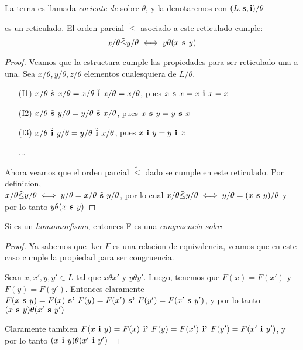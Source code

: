 \begin{definition}
  La terna  es llamada \emph{cociente de} \reticulAlg sobre $\theta$,
  y la denotaremos con $(L, \textbf{s}, \textbf{i})/\theta$
\end{definition}

\begin{lemma}
   es un reticulado. El orden
  parcial $\tilde{\leq}$ asociado a este reticulado cumple:
  $$
  x/\theta \tilde{\leq} y/\theta \iff y\theta(x\textbf{ s }y)
  $$
\end{lemma}

\begin{proof}
  Veamos que la estructura  cumple las propiedades para ser reticulado una a una.
  Sea $x/\theta, y/\theta, z/\theta$ elementos cualesquiera de $L/\theta$.
  \begin{itemize}
    \item[(I1)] $x/\theta\tilde{\textbf{ s }}x/\theta = x/\theta\tilde{\textbf{ i }}x/\theta = x/\theta$, pues $x\textbf{ s }x = x\textbf{ i }x = x$
    \item[(I2)] $x/\theta\tilde{\textbf{ s }}y/\theta = y/\theta\tilde{\textbf{ s }}x/\theta$, pues $x\textbf{ s }y = y\textbf{ s }x$
    \item[(I3)] $x/\theta\tilde{\textbf{ i }}y/\theta = y/\theta\tilde{\textbf{ i }}x/\theta$, pues $x\textbf{ i }y = y\textbf{ i }x$
    \item[] ... 
  \end{itemize}
  Ahora veamos que el orden parcial $\tilde{\leq}$ dado se cumple en este reticulado. Por definicion, \\$x/\theta \tilde{\leq} y/\theta \iff y/\theta = x/\theta\tilde{\textbf{ s }}y/\theta$,
  por lo cual $x/\theta \tilde{\leq} y/\theta \iff y/\theta = (x\textbf{ s }y)/\theta$ y por lo tanto $y\theta(x\textbf{ s }y)$
\end{proof}

\begin{lemma}
  Si  es un \emph{homomorfismo}, entonces F es una \emph{congruencia sobre} \reticulAlg
\end{lemma}
\begin{proof}
  Ya sabemos que $\ker F$ es una relacion de equivalencia, veamos que en este caso cumple la propiedad para ser congruencia.

  Sean $x, x', y, y' \in L$ tal que $x\theta x'$ y $y\theta y'$. Luego, tenemos que $F(x) = F(x')$ y $F(y) = F(y')$.
  Entonces claramente $F(x\textbf{ s }y) = F(x) \textbf{ s' } F(y) = F(x') \textbf{ s' } F(y') = F(x'\textbf{ s }y')$, y por lo tanto 
  $(x\textbf{ s }y)\theta(x'\textbf{ s }y')$
  
  Claramente tambien $F(x\textbf{ i }y) = F(x) \textbf{ i' } F(y) = F(x') \textbf{ i' } F(y') = F(x'\textbf{ i }y')$, y por lo tanto $(x\textbf{ i }y)\theta(x'\textbf{ i }y')$
\end{proof}

